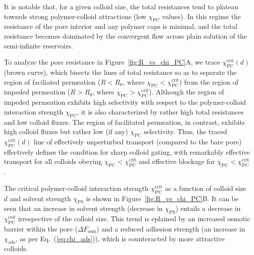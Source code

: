 \documentclass[12pt, a4paper]{article}
\begin{document}
It is notable that, for a given colloid size, the total resistances tend to plateau towards strong polymer-colloid attractions (low $\chi_{\text{PC}}$ values).
In this regime the resistance of the pore interior and any polymer caps is minimal, and the total resistance becomes dominated by the convergent flow across plain solution of the semi-infinite reservoirs.


To analyze the pore resistance in Figure~\ref{fig:R_vs_chi_PC}A, we trace $\chi_{\text{PC}}^{\text{crit}}(d)$ (brown curve), which bisects the lines of total resistance so as to separate the region of faciliated permeation ($R < R_{0}$, where $\chi_{\text{PC}} < \chi_{\text{PC}}^{\text{crit}}$) from the region of impeded permeation ($R > R_{0}$, where $\chi_{\text{PC}} > \chi_{\text{PC}}^{\text{crit}}$).
Although the region of impeded permeation exhibits high selectivity with respect to the polymer-colloid interaction strength $\chi_{\text{PC}}$, it is also characterized by rather high total resistances and low colloid fluxes.
The region of facilitated permeation, in contrast, exhibits high colloid fluxes but rather low (if any) $\chi_{\text{PC}}$ selectivity. 
Thus, the traced $\chi_{\text{PC}}^{\text{crit}}(d)$ line of effectively unperturbed transport (compared to the bare pore) effectively defines the condition for sharp colloid gating, with remarkably effective transport for all colloids obeying $\chi_{\text{PC}} < \chi_{\text{PC}}^{\text{crit}}$ and effective blockage for $\chi_{\text{PC}} < \chi_{\text{PC}}^{\text{crit}}$.

The critical polymer-colloid interaction strength $\chi_{\text{PC}}^{\text{crit}}$ as a function of colloid size $d$ and solvent strength $\chi_{\text{PS}}$ is shown in Figure~\ref{fig:R_vs_chi_PC}B.
It can be seen that an increase in solvent strength (decrease in $\chi_{\text{PS}}$) entails a decrease in $\chi_{\text{PC}}^{\text{crit}}$ irrespective of the colloid size. This trend is eplained by an increased osmotic barrier within the pore ($\Delta F_{\text{osm}}$) and a reduced adhesion strength (an increase in $\chi_{\text{ads}}$, as per Eq.~(\ref{eq:chi_ads})), which is counteracted by more attractive colloids.
\end{document}
